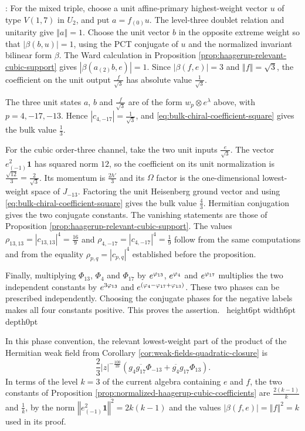 \documentclass[leqno]{article}
\newcommand{\qed}{\hfill \vrule height6pt  width6pt depth0pt}
\newcommand{\norm}[1]{\left\Vert#1\right\Vert}
\newcommand{\ot}{\otimes}
\let\i\relax
\newcommand{\i}{\mathrm{i}}
\newenvironment{proof}[1][]{\noindent {\it Proof #1} : }{\hbox{~}\qed
\smallskip
}
\numberwithin{equation}{section}
\begin{document}
\begin{proof}
For the mixed triple, choose a unit affine-primary highest-weight vector $u$ of type $V(1,7)$ in $U_2$, and put $a=f_{(0)}u$. The level-three doublet relation and unitarity give $\norm a = 1$. Choose the unit vector $b$ in the opposite extreme weight so that $|\beta(b,u)| = 1$, using the PCT conjugate of $u$ and the normalized invariant bilinear form $\beta$. The Ward calculation in Proposition \ref{prop:haagerup-relevant-cubic-support} gives $|\beta(a_{(2)}b,e)| = 1$. Since $|\beta(f,e)| = 3$ and $\norm f = \sqrt3$, the coefficient on the unit output $\frac{f}{\sqrt3}$ has absolute value $\frac1{\sqrt3}$.

The three unit states $a$, $b$ and $\frac{f}{\sqrt3}$ are of the form $w_p\ot e^\lambda$ above, with $p = 4,-17,-13$. Hence $|c_{4,-17}| = \frac1{\sqrt3}$, and \eqref{eq:bulk-chiral-coefficient-square} gives the bulk value $\frac13$.

For the cubic order-three channel, take the two unit inputs $\frac{e}{\sqrt3}$. The vector $e_{(-1)}^2\mathbf1$ has squared norm $12$, so the coefficient on its unit normalization is $\frac{\sqrt{12}}3 = \frac2{\sqrt3}$. Its momentum is $\frac{2h'}{3}$ and its $\Omega$ factor is the one-dimensional lowest-weight space of $J_{-13}$. Factoring the unit Heisenberg ground vector and using \eqref{eq:bulk-chiral-coefficient-square} gives the bulk value $\frac43$. Hermitian conjugation gives the two conjugate constants. The vanishing statements are those of Proposition \ref{prop:haagerup-relevant-cubic-support}. The values $\rho_{13,13} = |c_{13,13}|^4 = \frac{16}9$ and $\rho_{4,-17} = |c_{4,-17}|^4 = \frac19$ follow from the same computations and from the equality $\rho_{p,q} = |c_{p,q}|^4$ established before the proposition.

Finally, multiplying $\Phi_{13}$, $\Phi_4$ and $\Phi_{17}$ by $e^{\i\varphi_{13}}$, $e^{\i\varphi_4}$ and $e^{\i\varphi_{17}}$ multiplies the two independent constants by $e^{3\i\varphi_{13}}$ and $e^{\i(\varphi_4-\varphi_{17}+\varphi_{13})}$. These two phases can be prescribed independently. Choosing the conjugate phases for the negative labels makes all four constants positive. This proves the assertion.
\end{proof}

In this phase convention, the relevant lowest-weight part of the product of the Hermitian weak field from Corollary \ref{cor:weak-fields-quadratic-closure} is
\[
\frac23 |z|^{-\frac{100}{39}}
\left(g_4\overline{g_{17}}\Phi_{-13}+\overline{g_4}g_{17}\Phi_{13}\right).
\]
In terms of the level $k = 3$ of the current algebra containing $e$ and $f$, the two constants of Proposition \ref{prop:normalized-haagerup-cubic-coefficients} are $\frac{2(k-1)}{k}$ and $\frac1k$, by the norm $\norm{e_{(-1)}^2\mathbf1}^2 = 2k(k-1)$ and the values $|\beta(f,e)| = \norm f^2 = k$ used in its proof.
\end{document}

